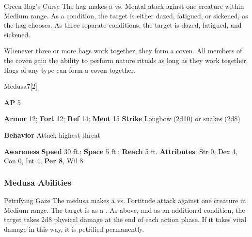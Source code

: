 \vspace{0.5em}
\begin{ability}{Green Hag's Curse}
The hag makes a  vs. Mental atack aginst one creature within Medium range.
\hit As a condition, the target is either dazed, fatigued, or sickened, as the hag chooses.
\crit As three separate conditions, the target is dazed, fatigued, and sickened.
\end{ability}

Whenever three or more hags work together, they form a coven.
All members of the coven gain the ability to perform nature rituals as long as they work together.
Hags of any type can form a coven together.

\begin{monsection}{Medusa}{7}[2]
\vspace{-1em}\vspace{-1em}
\begin{spellcontent}
\begin{spelltargetinginfo}
{\textbf{AP} 5}

\pari \textbf{Armor} 12;
\textbf{Fort} 12;
\textbf{Ref} 14;
\textbf{Ment} 15
\pari \textbf{Strike} Longbow  (2d10) or snakes  (2d8)



\pari \textbf{Behavior} Attack highest threat
\end{spelltargetinginfo}
\end{spellcontent}

\begin{monsterfooter}
\pari \textbf{Awareness} 
\pari \textbf{Speed} 30 ft.;
\textbf{Space} 5 ft.;
\textbf{Reach} 5 ft.
\pari \textbf{Attributes}:
Str 0,
Dex 4,
Con 0,
Int 4,
\textbf{Per 8},
Wil 8
\end{monsterfooter}
\end{monsection}


\subsubsection{Medusa Abilities}

\begin{ability}{Petrifying Gaze}
The medusa makes a  vs. Fortitude attack against one creature in Medium range.
\hit The target is  as a .
\crit As above, and as an additional condition, the target takes 2d8 physical damage at the end of each action phase.
If it takes vital damage in this way, it is petrified permanently.
\end{ability}

